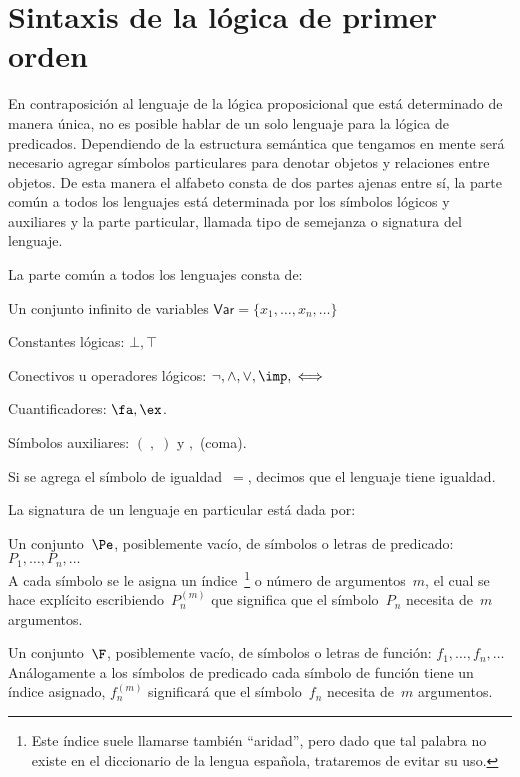 \documentclass[11pt,letterpaper]{article}
\begin{document}
\section{Sintaxis de la lógica de primer orden}

En contraposición al lenguaje de la lógica proposicional que está
determinado de manera única, no es posible hablar de un solo lenguaje
para la lógica de predicados. Dependiendo de la estructura semántica
que tengamos en mente será necesario agregar símbolos particulares
para denotar objetos y relaciones entre objetos. De esta manera
el alfabeto consta de dos partes ajenas entre sí, la parte común a
todos los lenguajes está determinada por los símbolos lógicos y auxiliares
y la parte particular, llamada tipo de semejanza o signatura del lenguaje.

\noindent La parte común a todos los lenguajes consta de:
\bi
 \item Un conjunto infinito de variables 
  $\mathsf{Var}=\{x_1,\ldots,x_n,\ldots\}$
 \item Constantes lógicas: $\bot,\top$
 \item Conectivos u operadores lógicos: $\neg,\land,\lor,\imp,\iff$
 \item Cuantificadores: $\fa,\ex$.
  \item Símbolos auxiliares: $(\;,\;)$ y $,$ (coma).
 \item Si se agrega el símbolo de igualdad~$=$, decimos que el lenguaje tiene 
  igualdad.
\ei

\noindent La signatura de un lenguaje en particular está dada por:
\bi
 \item Un conjunto~$\Pe$, posiblemente vacío, de símbolos o letras de
  predicado:  $ P_1,\ldots,P_n,\ldots$\\
  A cada símbolo se le asigna un índice~\footnote{Este índice suele llamarse 
  también \enquote{aridad}, pero dado que tal palabra no existe en el 
  diccionario de la lengua española, trataremos de evitar su uso.} o número 
  de argumentos~$m$, el cual se hace explícito escribiendo~$P_n^{(m)}$ que  
  significa que el símbolo~$P_n$ necesita de~$m$ argumentos.
  
 \item Un conjunto~$\F$, posiblemente vacío, de símbolos o letras de
  función:  $f_1,\ldots,f_n,\ldots$\\ 
  Análogamente a los símbolos de predicado cada símbolo de función tiene un 
  índice asignado, $f_n^{(m)}$ significará que el símbolo~$f_n$ necesita de~$m$ 
  argumentos.   
  
\end{document}
